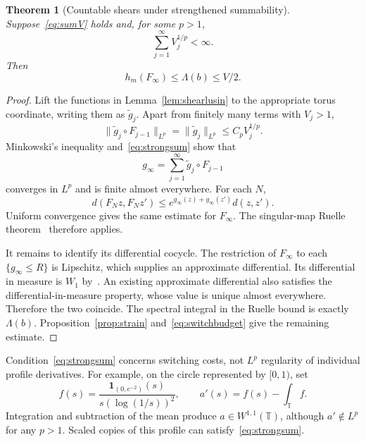 \documentclass[review,12pt,times,a4paper,nopreprintline]{elsarticle}
\theoremstyle{plain}
\newtheorem{theorem}{Theorem}[section]
\theoremstyle{definition}
\theoremstyle{remark}
\newcommand{\T}{\mathbb T}
\numberwithin{equation}{section}
\begin{document}
\begin{theorem}[Countable shears under strengthened summability]\label{thm:infiniteshear}
Suppose~\eqref{eq:sumV} holds and, for some $p>1$,
\begin{equation}\label{eq:strongsum}
 \sum_{j=1}^\infty V_j^{1/p}<\infty.
\end{equation}
Then
\begin{equation}\label{eq:infinitebound}
 h_m(F_\infty)\leq\Lambda(b)\leq V/2.
\end{equation}
\end{theorem}
\begin{proof}
Lift the functions in Lemma~\ref{lem:shearlusin} to the appropriate torus coordinate, writing them as $\widetilde g_j$. Apart from finitely many terms with $V_j>1$,
\[
 \|\widetilde g_j\circ F_{j-1}\|_{L^p}
 =\|\widetilde g_j\|_{L^p}\leq C_pV_j^{1/p}.
\]
Minkowski's inequality and~\eqref{eq:strongsum} show that
\[
 g_\infty=\sum_{j=1}^\infty\widetilde g_j\circ F_{j-1}
\]
converges in $L^p$ and is finite almost everywhere. For each $N$,
\[
 d(F_Nz,F_Nz')\leq e^{g_\infty(z)+g_\infty(z')}d(z,z').
\]
Uniform convergence gives the same estimate for $F_\infty$. The singular-map Ruelle theorem~\cite[Theorem 5.2]{BCJ} therefore applies.

It remains to identify its differential cocycle. The restriction of $F_\infty$ to each $\{g_\infty\leq R\}$ is Lipschitz, which supplies an approximate differential. Its differential in measure is $W_1$ by~\cite{LeBrisLions}. An existing approximate differential also satisfies the differential-in-measure property, whose value is unique almost everywhere. Therefore the two coincide. The spectral integral in the Ruelle bound is exactly $\Lambda(b)$. Proposition~\ref{prop:strain} and~\eqref{eq:switchbudget} give the remaining estimate.
\end{proof}

Condition~\eqref{eq:strongsum} concerns switching costs, not $L^p$ regularity of individual profile derivatives. For example, on the circle represented by $[0,1)$, set
\[
 f(s)=\frac{\mathbf1_{(0,e^{-2})}(s)}{s(\log(1/s))^2},\qquad
 a'(s)=f(s)-\int_{\T}f.
\]
Integration and subtraction of the mean produce $a\in W^{1,1}(\T)$, although $a'\notin L^p$ for any $p>1$. Scaled copies of this profile can satisfy~\eqref{eq:strongsum}.
\end{document}

